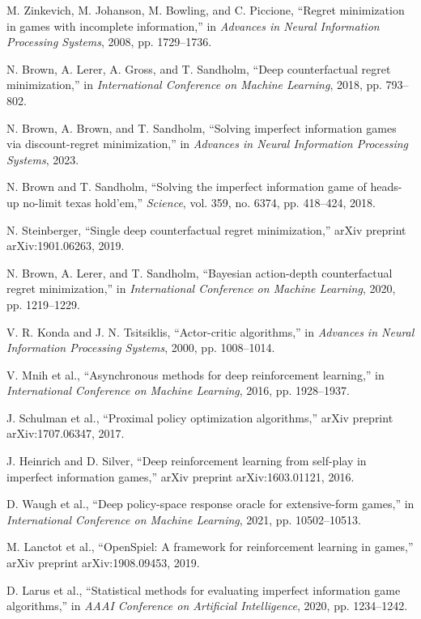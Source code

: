 \documentclass[10pt,twocolumn,conference]{IEEEtran}
\begin{document}

\begin{thebibliography}{00}

M. Zinkevich, M. Johanson, M. Bowling, and C. Piccione, ``Regret minimization in games with incomplete information,'' in \emph{Advances in Neural Information Processing Systems}, 2008, pp. 1729--1736.

N. Brown, A. Lerer, A. Gross, and T. Sandholm, ``Deep counterfactual regret minimization,'' in \emph{International Conference on Machine Learning}, 2018, pp. 793--802.

N. Brown, A. Brown, and T. Sandholm, ``Solving imperfect information games via discount-regret minimization,'' in \emph{Advances in Neural Information Processing Systems}, 2023.

N. Brown and T. Sandholm, ``Solving the imperfect information game of heads-up no-limit texas hold'em,'' \emph{Science}, vol. 359, no. 6374, pp. 418--424, 2018.

N. Steinberger, ``Single deep counterfactual regret minimization,'' arXiv preprint arXiv:1901.06263, 2019.

N. Brown, A. Lerer, and T. Sandholm, ``Bayesian action-depth counterfactual regret minimization,'' in \emph{International Conference on Machine Learning}, 2020, pp. 1219--1229.

V. R. Konda and J. N. Tsitsiklis, ``Actor-critic algorithms,'' in \emph{Advances in Neural Information Processing Systems}, 2000, pp. 1008--1014.

V. Mnih et al., ``Asynchronous methods for deep reinforcement learning,'' in \emph{International Conference on Machine Learning}, 2016, pp. 1928--1937.

J. Schulman et al., ``Proximal policy optimization algorithms,'' arXiv preprint arXiv:1707.06347, 2017.

J. Heinrich and D. Silver, ``Deep reinforcement learning from self-play in imperfect information games,'' arXiv preprint arXiv:1603.01121, 2016.

D. Waugh et al., ``Deep policy-space response oracle for extensive-form games,'' in \emph{International Conference on Machine Learning}, 2021, pp. 10502--10513.

M. Lanctot et al., ``OpenSpiel: A framework for reinforcement learning in games,'' arXiv preprint arXiv:1908.09453, 2019.

D. Larus et al., ``Statistical methods for evaluating imperfect information game algorithms,'' in \emph{AAAI Conference on Artificial Intelligence}, 2020, pp. 1234--1242.

\end{thebibliography}
\end{document}
